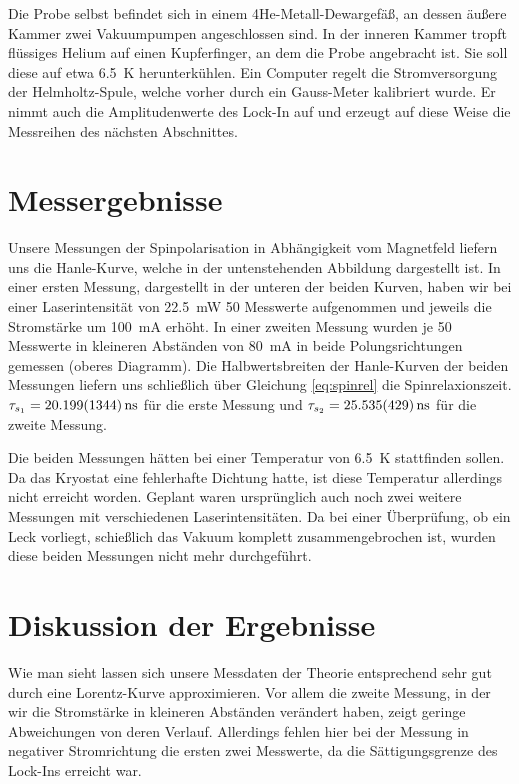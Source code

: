 \documentclass[11pt,twoside=true]{scrartcl}
\begin{document}
Die Probe selbst befindet sich in einem 4He-Metall-Dewargefäß, an dessen äußere
Kammer zwei Vakuumpumpen angeschlossen sind. In der inneren Kammer tropft
flüssiges Helium auf einen Kupferfinger, an dem die Probe angebracht ist. Sie
soll diese auf etwa \SI{6.5}{\kelvin} herunterkühlen.  Ein Computer regelt die
Stromversorgung der Helmholtz-Spule, welche vorher durch ein Gauss-Meter
kalibriert wurde. Er nimmt auch die Amplitudenwerte des Lock-In auf und erzeugt
auf diese Weise die Messreihen des nächsten Abschnittes.  





\section{Messergebnisse}
Unsere Messungen der Spinpolarisation in Abhängigkeit vom Magnetfeld liefern
uns die Hanle-Kurve, welche in der untenstehenden Abbildung dargestellt ist. In
einer ersten Messung, dargestellt in der unteren der beiden Kurven, haben wir
bei einer Laserintensität von \SI{22.5}{\milli\watt} 50 Messwerte aufgenommen
und jeweils die Stromstärke um \SI{100}{\milli\ampere} erhöht. In einer zweiten
Messung wurden je 50 Messwerte in kleineren Abständen von
\SI{80}{\milli\ampere} in beide Polungsrichtungen gemessen (oberes Diagramm).
Die Halbwertsbreiten der Hanle-Kurven der beiden Messungen liefern uns
schließlich über Gleichung \ref{eq:spinrel} die Spinrelaxionszeit.
$
\tau_{s_1}=\SI{20.199 \pm 1.344}{\nano\second}
$
für die erste Messung und
$
\tau_{s_2}=\SI{25.535 \pm 0.429}{\nano\second}
$
für die zweite Messung.

Die beiden Messungen hätten bei einer Temperatur von \SI{6.5}{\kelvin}
stattfinden sollen. Da das Kryostat eine fehlerhafte Dichtung hatte, ist diese
Temperatur allerdings nicht erreicht worden. Geplant waren ursprünglich auch
noch zwei weitere Messungen mit verschiedenen Laserintensitäten. Da bei einer
Überprüfung, ob ein Leck vorliegt, schießlich das Vakuum komplett
zusammengebrochen ist, wurden diese beiden Messungen nicht mehr durchgeführt.





\section{Diskussion der Ergebnisse}
Wie man sieht lassen sich unsere Messdaten der Theorie entsprechend sehr gut
durch eine Lorentz-Kurve approximieren. Vor allem die zweite Messung, in der
wir die Stromstärke in kleineren Abständen verändert haben, zeigt geringe
Abweichungen von deren Verlauf. Allerdings fehlen hier bei
der Messung in negativer Stromrichtung die ersten zwei Messwerte, da die
Sättigungsgrenze des Lock-Ins erreicht war. 
\end{document}
